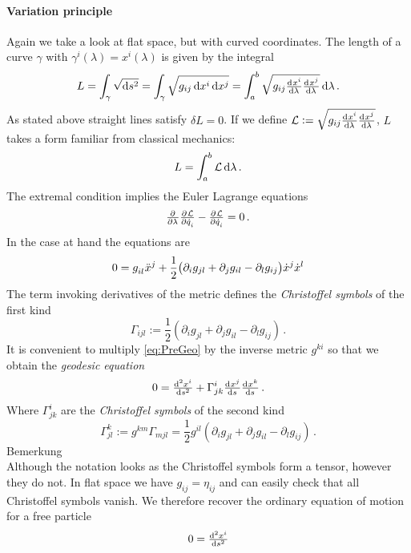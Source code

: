 \paragraph{Variation principle}
Again we take a look at flat space, but with curved coordinates. The length of a curve $\gamma$ with $\gamma^i(\lambda) = x^i(\lambda)$ is given by the integral
\begin{equation}
    L=\int_{\gamma}\sqrt{\dif s^2} =\int_{\gamma}\sqrt{g_{ij}\dif x^i\dif x^j}=\int_{a}^{b}\sqrt{g_{ij}\od{x^i}{\lambda} \od{x^j}{\lambda}}\dif \lambda\, .
\end{equation}
As stated above straight lines satisfy $\delta L = 0$. If we define $\mathcal{L}:=\sqrt{g_{ij}\od{x^i}{\lambda} \od{x^j}{\lambda}}$, $L$ takes a form familiar from classical mechanics:
\begin{equation}
    L=\int_a^b \mathcal{L}\dif \lambda\, .
\end{equation}
The extremal condition implies the Euler Lagrange equations
\begin{equation}
    \pd{}{\lambda}\pd{\mathcal{L}}{\dot{q}_i}-\pd{\mathcal{L}}{\dot{q}_i}
=0\, .		\end{equation}
In the case at hand the equations are
\begin{equation}
    0=\tensor{g}{_i_l}\tensor{\ddot{x}}{^j}+\frac{1}{2} \left(\partial_i g_{jl} + \partial_j g_{il} - \partial_l g_{ij}\right)\dot{x}^j\dot{x}^l \label{eq:PreGeo}
\end{equation}
The term invoking derivatives of the metric defines the \emph{Christoffel symbols} of the first kind
\begin{equation}
    \Gamma_{ijl}:=\frac{1}{2} \left(\partial_i g_{jl} + \partial_j g_{il} - \partial_l g_{ij}\right)\, .
\end{equation}
It is convenient to multiply \eqref{eq:PreGeo} by the inverse metric $g^{ki}$ so that we obtain the \emph{geodesic equation}
\begin{equation}
    0 = \od[2]{x^i}{s}+\Gamma^i_{jk}\od{x^j}{s}\od{x^k}{s}\, .
\end{equation}
Where $\Gamma^i_{jk}$ are the \emph{Christoffel symbols} of the second kind
\begin{equation}
    \Gamma^k_{jl}:=g^{km}\Gamma_{mjl}=\frac{1}{2}g^{il}\left(\partial_i g_{jl} + \partial_j g_{il} - \partial_l g_{ij}\right)\, .
\end{equation}
Bemerkung \\
Although the notation looks as the Christoffel symbols form a tensor, however they do not. In flat space we have $g_{ij}=\eta_{ij}$ and can easily check that all Christoffel symbols vanish. We therefore recover the ordinary equation of motion for a free particle
\begin{equation}
    0 = \od[2]{x^i}{s}
\end{equation}
